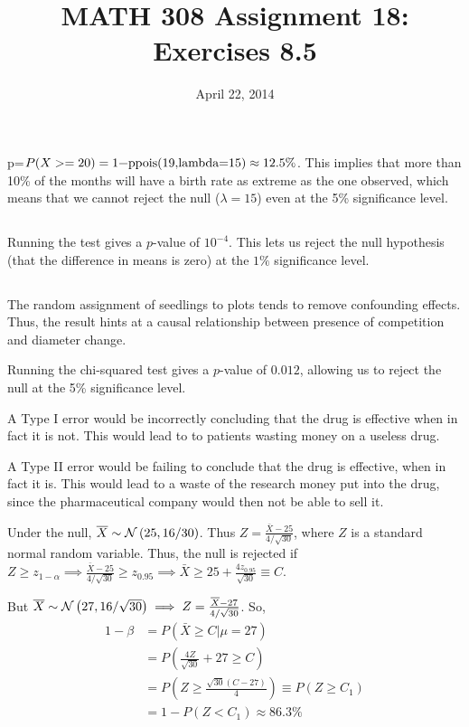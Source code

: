 \documentclass[twocolumn]{article}
\title{MATH 308 Assignment 18:\\Exercises 8.5}
\date{April 22, 2014}
\begin{document}
\maketitle

p=$P(X>=20)=\text{\code{1-ppois(19,lambda=15)}}\approx 12.5\%$. This implies that more than 10\% of the months will have a birth rate as extreme as the one observed, which means that we cannot reject the null ($\lambda=15$) even at the 5\% significance level.

\subsection{} Running the test gives a $p$-value of $10^{-4}$. This lets us reject the null hypothesis (that the difference in means is zero) at the $1\%$ significance level.
\subsection{} The random assignment of seedlings to plots tends to remove confounding effects. Thus, the result hints at a causal relationship between presence of competition and diameter change.

Running the chi-squared test gives a $p$-value of $0.012$, allowing us to reject the null at the 5\% significance level.

A Type I error would be incorrectly concluding that the drug is effective when in fact it is not. This would lead to to patients wasting money on a useless drug.

A Type II error would be failing to conclude that the drug is effective, when in fact it is. This would lead to a waste of the research money put into the drug, since the pharmaceutical company would then not be able to sell it.

Under the null, $\overline{X}\sim\mathcal{N}\left(25,16/30\right)$. Thus $Z=\frac{\bar X-25}{4/\sqrt{30}}$, where $Z$ is a standard normal random variable. Thus, the null is rejected if $Z\ge z_{1-\alpha}
\implies \frac{\bar X-25}{4/\sqrt{30}}\ge z_{0.95}\implies \bar X\ge 25+\frac{4z_{0.95}}{\sqrt{30}}\equiv C$.

But $\overline{X} \sim\mathcal{N}\left(27,16/\sqrt{30}\right)\implies Z=\frac{\overline{X}-27}{4/\sqrt{30}}$. So, \begin{align*}
	1-\beta&=P(\bar X\ge C|\mu=27)\\
	&=P\left(\frac{4Z}{\sqrt{30}}+27\ge C\right)\\
	&=P\left(Z\ge\frac{\sqrt{30}(C-27)}{4}\right)\equiv P(Z \ge C_1)\\
	&=1-P(Z<C_1)\approx 86.3\%
\end{align*}
\end{document}
